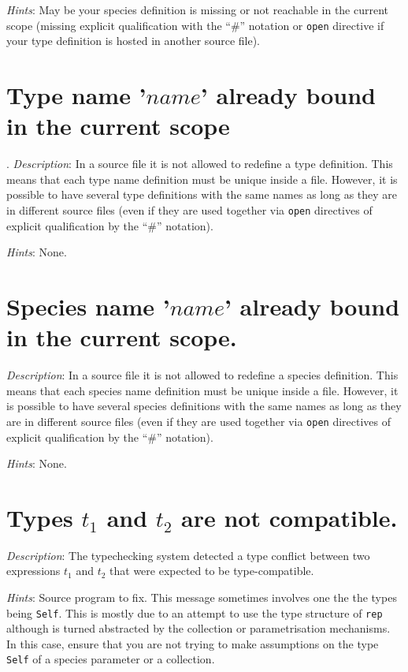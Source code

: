 {\em Hints}: May be your species definition is missing or not
reachable in the current scope (missing explicit qualification with
the ``\#'' notation or {\tt open} directive if your type definition is
hosted in another source file).




\section*{Type name '$name$' already bound in the current scope}.
{\em Description}: In a source file it is not allowed to redefine a
type definition. This means that each type name definition must be
unique inside a file. However, it is possible to have several type
definitions with the same names as long as they are in different
source files (even if they are used together via {\tt open} directives
of explicit qualification by the ``\#'' notation).

{\em Hints}: None.



\section*{Species name '$name$' already bound in the current scope.}
{\em Description}: In a source file it is not allowed to redefine a
species definition. This means that each species name definition must
be unique inside a file. However, it is possible to have several species
definitions with the same names as long as they are in different
source files (even if they are used together via {\tt open} directives
of explicit qualification by the ``\#'' notation).

{\em Hints}: None.



\section*{Types $t_1$ and $t_2$ are not compatible.}
{\em Description}: The typechecking system detected a type conflict
between two expressions $t_1$ and $t_2$ that were expected to be
type-compatible.

{\em Hints}: Source program to fix. This message sometimes involves
one the the types being {\tt Self}. This is mostly due to an attempt
to use the type structure of {\tt rep} although is turned abstracted
by the collection or parametrisation mechanisms. In this case, ensure
that you are not trying to make assumptions on the type {\tt Self} of
a species parameter or a collection.



